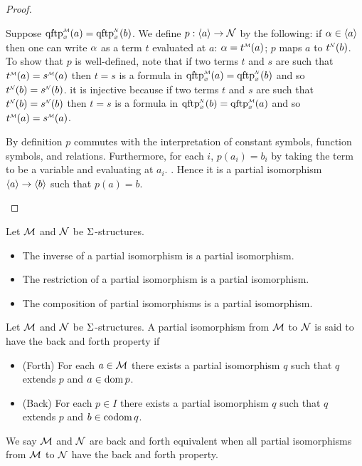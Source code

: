 \begin{proof}
    \begin{backward}
        Suppose $\subintp{\nothing}{\MM}{\qftp}(a) = 
        \subintp{\nothing}{\NN}{\qftp}(b)$.
        We define $p : \langle a\rangle \to \mathcal{N}$ by the following:
        if $\alpha \in \langle a\rangle$ then one can write $\alpha$ as a term $t$ evaluated
        at $a$: $\al = \mmintp{t}(a)$; $p$ maps $a$ to $\nnintp{t}(b)$.
        To show that $p$ is well-defined, note that if two terms $t$ and $s$
        are such that $\mmintp{t}(a) = \mmintp{s}(a)$ then 
        $t = s$ is a formula in $\subintp{\nothing}{\MM}{\qftp}(a) = 
        \subintp{\nothing}{\NN}{\qftp}(b)$ and so 
        $\nnintp{t}(b) = \nnintp{s}(b)$.
        it is injective because if two terms $t$ and $s$
        are such that $\nnintp{t}(b) = \nnintp{s}(b)$ then 
        $t = s$ is a formula in $\subintp{\nothing}{\NN}{\qftp}(b) = 
        \subintp{\nothing}{\MM}{\qftp}(a)$ and so 
        $\mmintp{t}(a) = \mmintp{s}(a)$.

        By definition $p$ commutes with the interpretation of constant symbols,
        function symbols, and relations.
        Furthermore, for each $i$, $p(a_i) = b_i$ by taking the term to be a 
        variable and evaluating at $a_i$. 
        .
        Hence it is a partial isomorphism $\langle a\rangle \to \langle b\rangle$ 
        such that $p(a) = b$.
    \end{backward}
\end{proof}

\begin{prop}
    Let $\mathcal{M}$ and $\mathcal{N}$ be $\Sigma$-structures.
    \begin{itemize}
        \item The inverse of a partial isomorphism is a partial isomorphism.
        \item The restriction of a partial isomorphism is a partial isomorphism.
        \item The composition of partial isomorphisms is a partial isomorphism.
    \end{itemize}
\end{prop}

\begin{dfn}
    Let $\mathcal{M}$ and $\mathcal{N}$ be $\Sigma$-structures.
    A partial isomorphism from $\mathcal{M}$ to $\mathcal{N}$ is said to have 
    the back and forth property if 
    \begin{itemize}
        \item (Forth) For each $a \in \mathcal{M}$
            there exists a partial isomorphism $q$ such that 
            $q$ extends $p$ and $a \in \operatorname{dom}{p}$.
        \item (Back) For each $p \in I$ 
            there exists a partial isomorphism $q$ such that 
            $q$ extends $p$ and $b \in \operatorname{codom}{q}$.
    \end{itemize}

    We say $\mathcal{M}$ and $\mathcal{N}$ are back and forth equivalent 
    when all partial isomorphisms from $\mathcal{M}$ to $\mathcal{N}$ 
    have the back and forth property.
\end{dfn}

